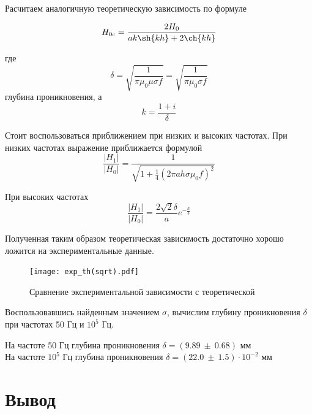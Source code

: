     Расчитаем аналогичную теоретическую зависимость по формуле

    \begin{equation}
        H_{0c} = \frac{2 H_0}{a k \sh{k h} + 2 \ch{k h}}
    \end{equation}

    где
    \begin{equation}
        \delta = \sqrt{\frac{1}{\pi \mu_0 \mu \sigma f}} = \sqrt{\frac{1}{\pi \mu_0 \sigma f}}
    \end{equation}
    глубина проникновения, а
    \begin{equation}
       k = \frac{1 + i}{\delta} 
    \end{equation}

    Стоит воспользоваться приближением при низких и высоких частотах. 
    При низких частотах выражение приближается формулой 
    \begin{equation}
        \frac{|H_1|}{|H_0|} = \frac{1}{\sqrt{1 + \frac{1}{4} (2 \pi a h \sigma \mu_0 f)^2}}
    \end{equation}

    При высоких частотах 
    \begin{equation}
        \frac{|H_1|}{|H_0|} = \frac{2 \sqrt{2} \delta}{a} e^{-\frac{h}{\delta}}
    \end{equation}

    Полученная таким образом теоретическая зависимость достаточно хорошо ложится на экспериментальные данные.

    \begin{figure}
        \centering
        \texttt{[image: exp\_th(sqrt).pdf]}
        \caption{Сравнение экспериментальной зависимости с теоретической}
        \label{exp_th(sqrt)}
    \end{figure}

    Воспользовавшись найденным значением $\sigma$, вычислим глубину проникновения $\delta$ при частотах 50 Гц и $10^5$ Гц.

    \begin{center}
        На частоте 50 Гц глубина проникновения $\delta = (9.89 ~ \pm ~ 0.68)$ мм \\
        На частоте $10^5$ Гц глубина проникновения $\delta = (22.0 ~ \pm ~ 1.5) \cdot 10^{-2}$ мм
    \end{center}

	\section*{Вывод}

